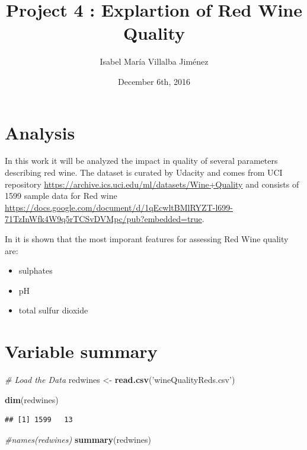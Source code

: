 \documentclass[]{article}
\title{Project 4 : Explartion of Red Wine Quality}
\author{Isabel María Villalba Jiménez}
\date{December 6th, 2016}
\newenvironment{Shaded}{\begin{snugshade}}{\end{snugshade}}
\newcommand{\KeywordTok}[1]{\textcolor[rgb]{0.13,0.29,0.53}{\textbf{{#1}}}}
\newcommand{\StringTok}[1]{\textcolor[rgb]{0.31,0.60,0.02}{{#1}}}
\newcommand{\CommentTok}[1]{\textcolor[rgb]{0.56,0.35,0.01}{\textit{{#1}}}}
\newcommand{\NormalTok}[1]{{#1}}
\begin{document}
\maketitle

\section{Analysis}\label{analysis}

In this work it will be analyzed the impact in quality of several
parameters describing red wine. The dataset is curated by Udacity and
comes from UCI repository
\url{https://archive.ics.uci.edu/ml/datasets/Wine+Quality} and consists
of 1599 sample data for Red wine
\url{https://docs.google.com/document/d/1qEcwltBMlRYZT-l699-71TzInWfk4W9q5rTCSvDVMpc/pub?embedded=true}.

In \citet{cortez2009modeling} it is shown that the most imporant
features for assessing Red Wine quality are:

\begin{itemize}
\item
  sulphates
\item
  pH
\item
  total sulfur dioxide
\end{itemize}

\section{Variable summary}\label{variable-summary}

\begin{Shaded}
\begin{Highlighting}[]
\CommentTok{# Load the Data}
\NormalTok{redwines <-}\StringTok{ }\KeywordTok{read.csv}\NormalTok{(}\StringTok{'wineQualityReds.csv'}\NormalTok{)}

\KeywordTok{dim}\NormalTok{(redwines)}
\end{Highlighting}
\end{Shaded}

\begin{verbatim}
## [1] 1599   13
\end{verbatim}

\begin{Shaded}
\begin{Highlighting}[]
\CommentTok{#names(redwines)}
\KeywordTok{summary}\NormalTok{(redwines)}
\end{Highlighting}
\end{Shaded}
\end{document}
